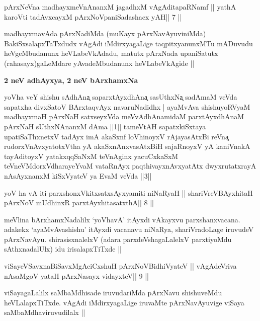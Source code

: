 
\begin{shl}
pArxNeVna madhayxmeVnAnanxM jagadhxM vAgAditapaRNamf ||
yathA karoVti tadAvxcayxM pArxNoVpaniSadashacx yAH\hfill || 7 ||
\end{shl}

\begin{artha}
madhayxmavAda pArxNadiMda (muKayx pArxNavAyuviniMda)
BakiSxsalapxTaTxdudx vAgAdi iMdirxyagaLige taqpitxyanunxMTu mADuvudu
heVgeMbudanunx heVLabeVkAdadu, matutx pArxNada upaniSatutx
(rahasayx)gaLeMdare yAvadeMbudanunx heVLabeVkAgide ||
\end{artha}

\medskip
\centerline{\textbf{2 neV adhAyxya, 2 neV bArxhamxNa}}

\begin{artha}
yoVha veY shishu sAdhAna{\c} saparxtAyxdhAna{\c} sasUthxNa{\c} sadAmaM veVda
sapatxha divxSatoV BArxtaqvAyx navaruNadidhx | ayaMvAva shishuyoRVyaM
madhayxmaH pArxNaH satxseyxVda meVvAdhAnamidaM parxtAyxdhAnaM pArxNaH
sUthxNAnanxM dAma ||1|| tameVtAH sapatxkiSxtaya upatiSaThxnetxV tadAyx
imA akaSxnf loVhinoyxV rAjayasAtxBi reVna{\c} rudorxV\s nAvxyatotxV\s tha
yA akaSxnAnxvasAtxBiH sajaRnoyxV yA kaniVnakA tayAditoyxV
yatakxqqSaNxM teVnAginx yacuCxkaSxM teVneVMdorxV\s dharayeYvaM
vataRnAyx paqthivayxnAvxyatAtx dwyxrutatxrayA nAsAyxnanxM kiSxVyateV
ya EvaM veVda ||3||
\end{artha}

\begin{shl}
yoV ha vA iti parxshonxVkitxsatxsAyxyamiti niNaRyaH ||
shariVreV\s BAyxhitaH pArxNoV mUdhinxR parxtAyxhitasatxthA\hfill || 8 ||
\end{shl}

\begin{center}
meVlina bArxhamxNadalilx `yoVhavA' itAyxdi vAkayxvu parxshanxvacana.
adakekx `ayaMvAvashishu' itAyxdi vacanavu niNaRya, shariVradoLage
iruvudeV pArxNavAyu. shirasisxnalelxV (adara parxdeVshagaLalelxV
parxtiyoMdu sAthxnadalUlx) idu irisalapxTiTxde ||
\end{center}

\begin{shl}
viSayeVSavxnaBiSavxMgAciCxshuH  pArxNoV\s BidhiVyateV ||
vAgAdeVriva nA\s\s saMgoV yataH pArxNasayx vidayxteV\hfill || 9 ||
\end{shl}

\begin{artha}
viSayagaLalilx saMbaMdhisade iruvudariMda pArxNavu shishuveMdu
heVLalapxTiTxde. vAgAdi iMdirxyagaLige iruvaMte pArxNavAyuvige viSaya
saMbaMdhaviruvudilalx ||
\end{artha}

